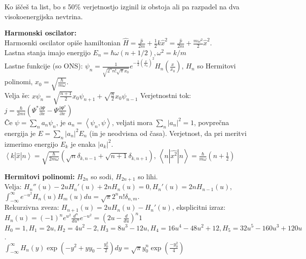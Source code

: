 \documentclass[a4paper, oneside, 12pt]{article}
\title{\mytitle}
\author{Jure Slak}
\date{\today}
\theoremstyle{definition}
\renewcommand{\H}{\ensuremath{\hat{H}}}
\begin{document}
\pagestyle{empty}

Ko iščeš ta list, bo s 50\% verjetnostjo izginil iz obstoja ali
pa razpadel na dva visokoenergijska nevtrina.

\textbf{Harmonski oscilator:} \\
Harmosnki oscilator opiše hamiltonian $\H = \frac{\hat{p}}{2m} + \frac{1}{2}k\hat{x}^2 = \frac{\hat{p}}{2m} + \frac{m \omega^2}{2}\hat{x}^2$. \\
Lastna stanja imajo energijo $E_n = \hbar\omega(n+1/2), \omega^2 = k/m$ \\
Lastne funkcije (so ONS):
$\displaystyle \psi_n = \frac{1}{\sqrt{2^nn!\sqrt{\pi}x_0}}
e^{-\frac{1}{2}\left(\frac{x}{x_0}\right)^2}\textstyle H_n\left(\frac{x}{x_0}\right)$,
$H_n$ so Hermitovi polinomi, $x_0 = \sqrt{\frac{\hbar}{m \omega}}$. \\
Velja še: $x\psi_n = \sqrt{\frac{n+1}{2}}x_0\psi_{n+1} + \sqrt{\frac{n}{2}}x_0\psi_{n-1}$ \quad Verjetnostni tok:
$j = \frac{\hbar}{2mi}\left(\Psi^* \frac{\partial \Psi }{\partial x}-
\Psi \frac{\partial \Psi^* }{\partial x} \right)$\\
Če $\psi = \sum_n a_n \psi_n$, je $a_n = \left\langle \psi_n, \psi\right\rangle$, veljati mora $\sum_n |a_n|^2 = 1$, povprečna energija je $E = \sum_n |a_n|^2 E_n$ (in je neodvisna od časa). Verjetnost, da pri meritvi izmerimo energijo $E_k$ je enaka $|a_k|^2$.\\
$\left\langle k|\hat{x}|n\right\rangle = \sqrt{\frac{\hbar}{2m\omega}} (\sqrt{n} \delta_{k, n-1} + \sqrt{n+1} \delta_{k, n+1})$, $\left\langle n|\hat{x^2}|n\right\rangle = \frac{\hbar}{m \omega} (n + \frac{1}{2})$

\textbf{Hermitovi polinomi:} $H_{2n}$ so sodi, $H_{2n+1}$ so lihi.\\
Velja:
$H_n''(u) - 2uH_n'(u) + 2nH_n(u) = 0, H_n'(u) = 2nH_{n-1}(u)$,
$\int_{-\infty}^\infty e^{-u^2} H_n(u)H_m(u) du = \sqrt{\pi}2^nn!\delta_{n,m}$. \\
Rekurzivna zveza: $H_{n+1}(u)= 2uH_n(u)-H_n'(u)$, eksplicitni izraz:
$H_n(u)=(-1)^n e^{u^2}\frac{d^n}{du^n}e^{-u^2}=\left (2u-\frac{d}{du} \right )^n 1$
$H_0 = 1, H_1 = 2u, H_2 = 4u^2-2, H_3 = 8u^3 - 12u, H_4 = 16u^4 - 48u^2 + 12,
H_5 = 32u^5 - 160u^3 + 120u$.\\
$\int_{-\infty}^\infty H_n(y) \exp(-y^2 + y y_0 - \frac{y_0^2}{2}) dy = \sqrt{\pi} y_0^n \exp(\frac{-y_0^2}{4})$
\end{document}
